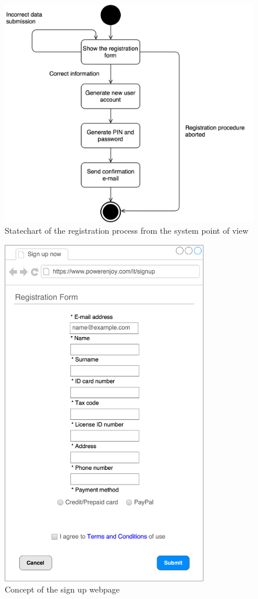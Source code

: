 \begin{figure}[H]
\begin{center}
		\includegraphics[width=\textwidth]{./specific_requirements/features/diagrams/registration_statechart.png}
		\caption{Statechart of the registration process from the system point of view}
		\label{register_st}
\end{center}
\end{figure}

\begin{figure}[H]
\begin{center}
		\includegraphics[width=0.8\textwidth]{./specific_requirements/features/diagrams/web_registration.png}
		\caption{Concept of the sign up webpage}
\end{center}
\end{figure}